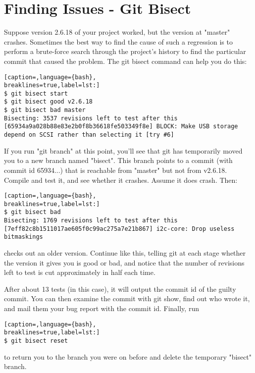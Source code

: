 \section{Finding Issues - Git Bisect}
Suppose version 2.6.18 of your project worked, but the version at "master"
crashes. Sometimes the best way to find the cause of such a regression is to
perform a brute-force search through the project's history to find the
particular commit that caused the problem. The git bisect command can help you
do this:
\lstset{basicstyle=\scriptsize, numbers=none, captionpos=b, tabsize=4}
\begin{lstlisting}[caption=,language={bash},
breaklines=true,label=lst:]
$ git bisect start
$ git bisect good v2.6.18
$ git bisect bad master
Bisecting: 3537 revisions left to test after this
[65934a9a028b88e83e2b0f8b36618fe503349f8e] BLOCK: Make USB storage depend on SCSI rather than selecting it [try #6]
\end{lstlisting}

If you run "git branch" at this point, you'll see that git has temporarily
moved you to a new branch named "bisect". This branch points to a commit (with
commit id 65934...) that is reachable from "master" but not from v2.6.18.
Compile and test it, and see whether it crashes. Assume it does crash. Then:
\lstset{basicstyle=\scriptsize, numbers=none, captionpos=b, tabsize=4}
\begin{lstlisting}[caption=,language={bash},
breaklines=true,label=lst:]
$ git bisect bad
Bisecting: 1769 revisions left to test after this
[7eff82c8b1511017ae605f0c99ac275a7e21b867] i2c-core: Drop useless bitmaskings
\end{lstlisting}

checks out an older version. Continue like this, telling git at each stage
whether the version it gives you is good or bad, and notice that the number of
revisions left to test is cut approximately in half each time.

After about 13 tests (in this case), it will output the commit id of the guilty
commit. You can then examine the commit with git show, find out who wrote it,
and mail them your bug report with the commit id. Finally, run
\lstset{basicstyle=\scriptsize, numbers=none, captionpos=b, tabsize=4}
\begin{lstlisting}[caption=,language={bash},
breaklines=true,label=lst:]
$ git bisect reset
\end{lstlisting}

to return you to the branch you were on before and delete the temporary
"bisect" branch.

